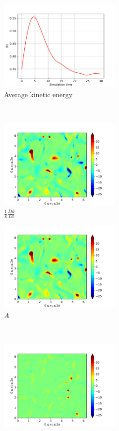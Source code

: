 \begin{figure}[H]
    \begin{subfigure}[H]{0.45\textwidth}
        \includegraphics[height=1.75in]{media/run-cds-65/ke-average1330}
        \caption{Average kinetic energy}
    \end{subfigure}
    ~
    \begin{subfigure}[H]{0.45\textwidth}
        \includegraphics[height=1.75in]{media/run-cds-65/ke-1330}
        \caption{$\frac{1}{k} \frac{D k}{Dt}$}
    \end{subfigure}
    \newline
    \begin{subfigure}{0.45\textwidth}
        \includegraphics[height=1.75in]{media/run-cds-65/A-ke-1330}
        \caption{$A$}
    \end{subfigure}
    ~
    \begin{subfigure}{0.45\textwidth}
        \includegraphics[height=1.75in]{media/run-cds-65/C-ke-1330}

\end{subfigure}
\end{figure}
